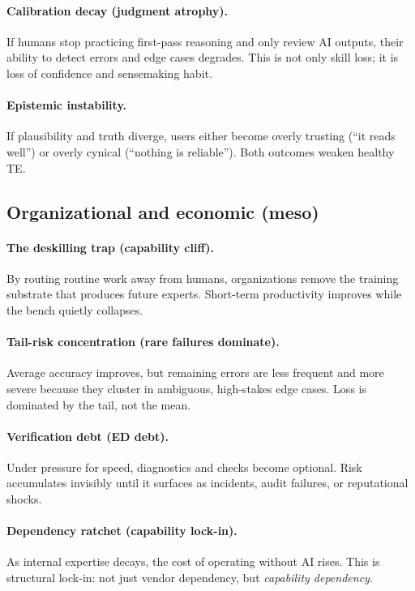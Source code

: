 \paragraph{Calibration decay (judgment atrophy).}
If humans stop practicing first-pass reasoning and only review AI outputs, their ability to detect errors and edge cases degrades. This is not only skill loss; it is loss of confidence and sensemaking habit.

\paragraph{Epistemic instability.}
If plausibility and truth diverge, users either become overly trusting (``it reads well'') or overly cynical (``nothing is reliable''). Both outcomes weaken healthy TE.

\subsection{Organizational and economic (meso)}
\paragraph{The deskilling trap (capability cliff).}
By routing routine work away from humans, organizations remove the training substrate that produces future experts. Short-term productivity improves while the bench quietly collapses.

\paragraph{Tail-risk concentration (rare failures dominate).}
Average accuracy improves, but remaining errors are less frequent and more severe because they cluster in ambiguous, high-stakes edge cases. Loss is dominated by the tail, not the mean.

\paragraph{Verification debt (ED debt).}
Under pressure for speed, diagnostics and checks become optional. Risk accumulates invisibly until it surfaces as incidents, audit failures, or reputational shocks.

\paragraph{Dependency ratchet (capability lock-in).}
As internal expertise decays, the cost of operating without AI rises. This is structural lock-in: not just vendor dependency, but \emph{capability dependency}.

